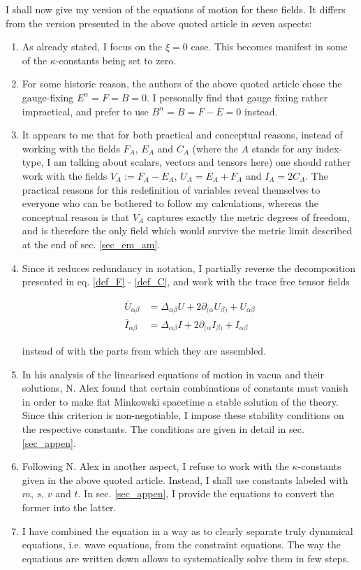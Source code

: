 \documentclass[11pt]{article}
\begin{document}
I shall now give my version of the equations of motion for these fields. It  differs from the version presented in the above quoted article in seven aspects:

\begin{enumerate}
	\item As already stated, I focus on the $\xi = 0$ case. This becomes manifest in some of the $\kappa$-constants being set to zero.
	\item For some historic reason, the authors of the above quoted article chose the gauge-fixing $E^\alpha = F = B = 0$. I personally find that gauge fixing rather impractical, and prefer to use $B^\alpha = B = F - E = 0 $ instead.
	\item It appears to me that for both practical and conceptual reasons, instead of working with the fields $F_A$, $E_A$ and $C_A$ (where the $A$ stands for any index-type, I am talking about scalars, vectors and tensors here) one should rather work with the fields $ V_A := F_A - E_A$,  $U_A = E_A + F_A$ and $I_A = 2 C_A$. The practical reasons for this redefinition of variables reveal themselves to everyone who can be bothered to follow my calculations, whereas the conceptual reason is that $V_A$ captures exactly the metric degrees of freedom, and is therefore the only field which would survive the metric limit described at the end of sec. \ref{sec_em_am}.
	\item Since it reduces redundancy in notation, I partially reverse the decomposition presented in eq. \ref{def_F} - \ref{def_C}, and work with the trace free tensor fields 

	\begin{align}
		\bar{U}_{\alpha \beta} &= \Delta_{\alpha \beta} U
		+  2 \partial_{ ( \alpha} U_{\beta )} 
		+  U_{\alpha \beta}\\
		\bar{I}_{\alpha \beta} &= \Delta_{\alpha \beta} I
		+  2 \partial_{ ( \alpha} I_{\beta )} 
		+  I_{\alpha \beta}
	\end{align}
	
		instead of with the parts from which they are assembled.
		
	\item In his analysis of the linearised equations of motion in vacua and their solutions, N. Alex found that certain combinations of constants must vanish in order to make flat Minkowski spacetime a stable solution of the theory. Since this criterion is non-negotiable, I impose these stability conditions on the respective constants. The conditions are given in detail in sec. \ref{sec_appen}.
	\item Following N. Alex in another aspect, I refuse to work with the $\kappa$-constants given in the above quoted article. Instead, I shall use constants labeled with $m$, $s$, $v$ and $t$. In sec. \ref{sec_appen}, I provide the equations to convert the former into the latter.
	\item I have combined the equation in a way as to clearly separate truly dynamical equations, i.e. wave equations, from the constraint equations. The way the equations are written down allows to systematically solve them in few steps.
\end{enumerate}
\end{document}
